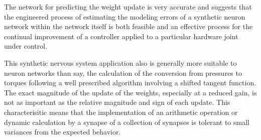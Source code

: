 
The network for predicting the weight update is very accurate and suggests that
the engineered process of estimating the modeling errors of a synthetic neuron
network within the network itself is both feasible and an effective process for
the continual improvement of a controller applied to a particular hardware
joint under control.

This synthetic nervous system application also is generally more suitable to neuron networks than say,
the calculation of the conversion from pressures to torques following a well
prescribed algorithm involving a shifted tangent function. The exact magnitude
of the update of the weights, especially at a reduced gain, is not as important
as the relative magnitude and sign of each update. This characterisitic means that the
implementation of an arithmetic operation or dynamic calculation by a synapse of
a collection of synapses is tolerant to small variances from the expected
behavior.
